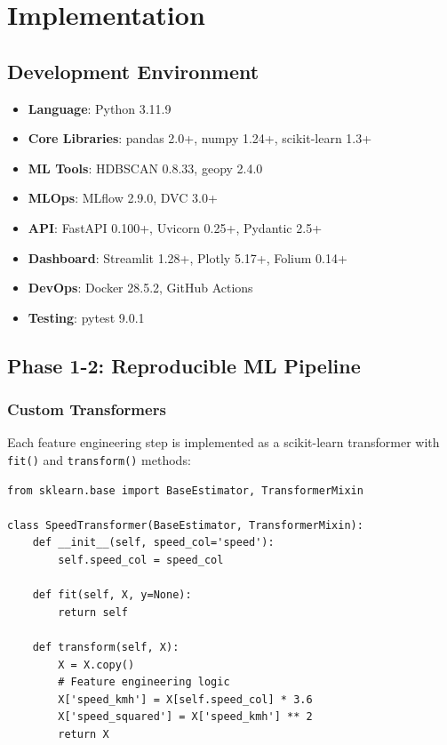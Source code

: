 \section{Implementation}

\subsection{Development Environment}

\begin{itemize}
    \item \textbf{Language}: Python 3.11.9
    \item \textbf{Core Libraries}: pandas 2.0+, numpy 1.24+, scikit-learn 1.3+
    \item \textbf{ML Tools}: HDBSCAN 0.8.33, geopy 2.4.0
    \item \textbf{MLOps}: MLflow 2.9.0, DVC 3.0+
    \item \textbf{API}: FastAPI 0.100+, Uvicorn 0.25+, Pydantic 2.5+
    \item \textbf{Dashboard}: Streamlit 1.28+, Plotly 5.17+, Folium 0.14+
    \item \textbf{DevOps}: Docker 28.5.2, GitHub Actions
    \item \textbf{Testing}: pytest 9.0.1
\end{itemize}

\subsection{Phase 1-2: Reproducible ML Pipeline}

\subsubsection{Custom Transformers}

Each feature engineering step is implemented as a scikit-learn transformer with \texttt{fit()} and \texttt{transform()} methods:

\begin{lstlisting}[style=python, caption=SpeedTransformer Example]
from sklearn.base import BaseEstimator, TransformerMixin

class SpeedTransformer(BaseEstimator, TransformerMixin):
    def __init__(self, speed_col='speed'):
        self.speed_col = speed_col
    
    def fit(self, X, y=None):
        return self
    
    def transform(self, X):
        X = X.copy()
        # Feature engineering logic
        X['speed_kmh'] = X[self.speed_col] * 3.6
        X['speed_squared'] = X['speed_kmh'] ** 2
        return X
\end{lstlisting}


